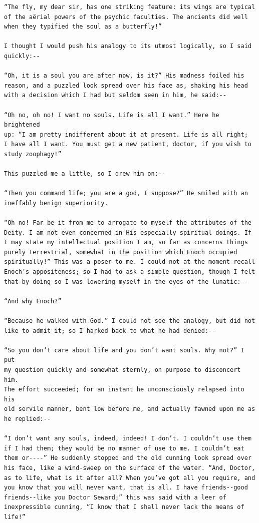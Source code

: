 \documentclass{article}
\begin{document}
\begin{verbatim}
“The fly, my dear sir, has one striking feature: its wings are typical
of the aërial powers of the psychic faculties. The ancients did well
when they typified the soul as a butterfly!”

I thought I would push his analogy to its utmost logically, so I said
quickly:--

“Oh, it is a soul you are after now, is it?” His madness foiled his
reason, and a puzzled look spread over his face as, shaking his head
with a decision which I had but seldom seen in him, he said:--

“Oh no, oh no! I want no souls. Life is all I want.” Here he brightened
up: “I am pretty indifferent about it at present. Life is all right;
I have all I want. You must get a new patient, doctor, if you wish to
study zoophagy!”

This puzzled me a little, so I drew him on:--

“Then you command life; you are a god, I suppose?” He smiled with an
ineffably benign superiority.

“Oh no! Far be it from me to arrogate to myself the attributes of the
Deity. I am not even concerned in His especially spiritual doings. If
I may state my intellectual position I am, so far as concerns things
purely terrestrial, somewhat in the position which Enoch occupied
spiritually!” This was a poser to me. I could not at the moment recall
Enoch’s appositeness; so I had to ask a simple question, though I felt
that by doing so I was lowering myself in the eyes of the lunatic:--

“And why Enoch?”

“Because he walked with God.” I could not see the analogy, but did not
like to admit it; so I harked back to what he had denied:--

“So you don’t care about life and you don’t want souls. Why not?” I put
my question quickly and somewhat sternly, on purpose to disconcert him.
The effort succeeded; for an instant he unconsciously relapsed into his
old servile manner, bent low before me, and actually fawned upon me as
he replied:--

“I don’t want any souls, indeed, indeed! I don’t. I couldn’t use them
if I had them; they would be no manner of use to me. I couldn’t eat
them or----” He suddenly stopped and the old cunning look spread over
his face, like a wind-sweep on the surface of the water. “And, Doctor,
as to life, what is it after all? When you’ve got all you require, and
you know that you will never want, that is all. I have friends--good
friends--like you Doctor Seward;” this was said with a leer of
inexpressible cunning, “I know that I shall never lack the means of
life!”


\end{verbatim}
\end{document}
